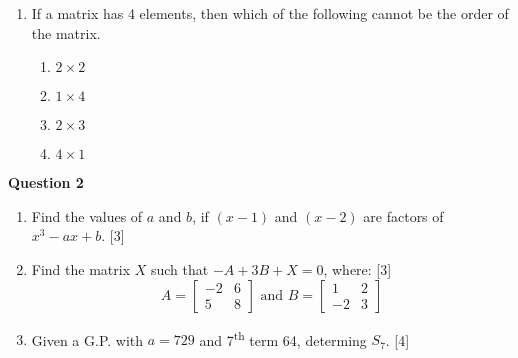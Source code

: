 \begin{enumerate}[label=(\roman*)]
    \item If a matrix has 4 elements, then which of the following cannot be the 
        order of the matrix.

        \begin{multicols}{2}
        \begin{enumerate}[label=(\alph*)]
            \item $2 \times 2$ 
            \item $1 \times 4$ 
            \item $2 \times 3$ 
            \item $4 \times 1$ 
        \end{enumerate}
        \end{multicols}

\end{enumerate}

\par
\noindent
\textbf{Question 2}\\
\begin{enumerate}[label=(\roman*)]

    \item Find the values of $a$ and $b$, if $(x-1)$ and $(x-2)$ 
        are factors of $x^3 - ax + b$. \hfill [3]

    \item Find the matrix $X$ such that $-A + 3B + X = 0$, where: \hfill [3]
        \[
            A = \begin{bmatrix*} -2 & 6  \\ 5 & 8 \end{bmatrix*}
            \text{ and }
            B = \begin{bmatrix*} 1 & 2  \\ -2 & 3 \end{bmatrix*}
        \]

    \item Given a G.P. with $a=729$ and 7\textsuperscript{th} 
        term 64, determing $S_7$. \hfill [4]

\end{enumerate}

